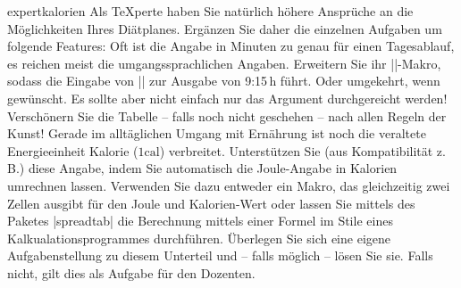 \documentclass[
	blatt=6,
	ausgabe=24.\,05.\,2010,
	rückgabe=28.\,05.\,2010
]{lcourse-hd}
\begin{document}
\begin{expertexercise}[
  name={Kalorien – advanced},
  abgabe = Quellcode per Mail{,} Quellcode und fertiges Dokument ausgedruckt.]{expertkalorien}
Als \TeX perte haben Sie natürlich höhere Ansprüche an die Möglichkeiten Ihres Diätplanes. Ergänzen Sie daher die einzelnen Aufgaben um folgende Features:
Oft ist die Angabe in Minuten zu genau für einen Tagesablauf, es reichen meist die umgangssprachlichen Angaben. Erweitern Sie ihr |\zeit|-Makro, sodass die Eingabe von || zur Ausgabe von 9:15\,h führt. Oder umgekehrt, wenn gewünscht. Es sollte aber nicht einfach nur das Argument durchgereicht werden!
Verschönern Sie die Tabelle – falls noch nicht geschehen – nach allen Regeln der Kunst!
Gerade im alltäglichen Umgang mit Ernährung ist noch die veraltete Energieeinheit Kalorie ($1\mathrm{cal}$) verbreitet. Unterstützen Sie (aus Kompatibilität z.\,B.) diese Angabe, indem Sie automatisch die Joule-Angabe in Kalorien umrechnen lassen. Verwenden Sie dazu entweder ein Makro, das gleichzeitig zwei Zellen ausgibt für den Joule und Kalorien-Wert oder lassen Sie mittels des Paketes |spreadtab| die Berechnung mittels einer Formel im Stile eines Kalkualationsprogrammes durchführen.
Überlegen Sie sich eine eigene Aufgabenstellung zu diesem Unterteil und – falls möglich – lösen Sie sie. Falls nicht, gilt dies als Aufgabe für den Dozenten.
\end{expertexercise}
\end{document}

